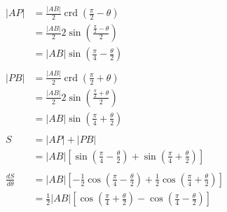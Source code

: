 \documentclass{article}
\newcommand{\crd}{\operatorname{crd}}
\begin{document}
\begin{align*}
  |AP|                                                 & = \frac{|AB|}{2} \crd \left( \frac{\pi}{2} - \theta \right)                                                                                                \\
                                                       & = \frac{|AB|}{2} 2 \sin \left( \frac{\frac{\pi}{2} - \theta}{2} \right)                                                                                    \\
                                                       & = |AB| \sin \left( \frac{\pi}{4} - \frac{\theta}{2} \right)                                                                                                \\ \\
  |PB|                                                 & = \frac{|AB|}{2} \crd \left( \frac{\pi}{2} + \theta \right)                                                                                                \\
                                                       & = \frac{|AB|}{2} 2 \sin \left( \frac{\frac{\pi}{2} + \theta}{2} \right)                                                                                    \\
                                                       & = |AB| \sin \left( \frac{\pi}{4} + \frac{\theta}{2} \right)                                                                                                \\ \\
  S                                                    & = |AP| + |PB|                                                                                                                                              \\
                                                       & = |AB| \left[ \sin \left( \frac{\pi}{4} - \frac{\theta}{2} \right) + \sin \left( \frac{\pi}{4} + \frac{\theta}{2} \right) \right]                          \\ \\
  \frac{d S}{d \theta}                                 & = |AB| \left[ -\frac{1}{2} \cos \left( \frac{\pi}{4} - \frac{\theta}{2} \right) + \frac{1}{2} \cos \left( \frac{\pi}{4} + \frac{\theta}{2} \right) \right] \\
                                                       & = \frac{1}{2} |AB| \left[ \cos \left( \frac{\pi}{4} + \frac{\theta}{2} \right) - \cos \left( \frac{\pi}{4} - \frac{\theta}{2} \right) \right]              \\ \\

\end{align*}
\end{document}
